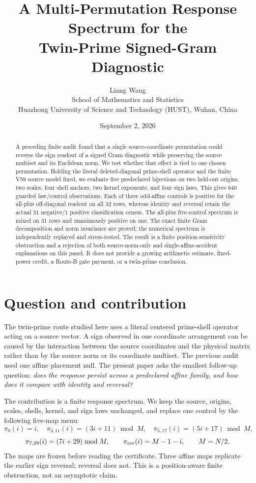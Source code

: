\documentclass[10pt]{article}
\title{A Multi-Permutation Response Spectrum for the\\
  \large Twin-Prime Signed-Gram Diagnostic}
\author{Liang Wang\\
School of Mathematics and Statistics\\
Huazhong University of Science and Technology (HUST), Wuhan, China}
\date{September 2, 2026}
\begin{document}
\maketitle

\begin{abstract}
A preceding finite audit found that a single source-coordinate permutation
could reverse the sign readout of a signed Gram diagnostic while preserving the
source multiset and its Euclidean norm.  We test whether that effect is tied to
one chosen permutation.  Holding the literal deleted-diagonal prime-shell
operator and the finite V59 source model fixed, we evaluate five predeclared
bijections on two held-out origins, two scales, four shell anchors, two kernel
exponents, and four sign laws.  This gives 640 guarded law/control
observations.  Each of three odd-affine controls is positive for the all-plus
off-diagonal readout on all 32 rows, whereas identity and reversal retain the
actual $31$ negative/$1$ positive classification census.  The all-plus
five-control spectrum is mixed on 31 rows and unanimously positive on one.
The exact finite Gram decomposition and norm invariance are proved; the
numerical spectrum is independently replayed and stress-tested.  The result
is a finite position-sensitivity obstruction and a rejection of both
source-norm-only and single-affine-accident explanations on this panel.  It
does not provide a growing arithmetic estimate, fixed-power credit, a
Route-B gate payment, or a twin-prime conclusion.
\end{abstract}

\section{Question and contribution}

The twin-prime route studied here uses a literal centered
prime-shell operator acting on a source vector.  A sign observed in one
coordinate arrangement can be caused by the interaction between the source
coordinates and the physical matrix rather than by the source norm or its
coordinate multiset.  The previous audit used one affine placement null.  The
present paper asks the smallest follow-up question:
\emph{does the response persist across a predeclared affine family, and how
does it compare with identity and reversal?}

The contribution is a finite response spectrum.  We keep the source, origins,
scales, shells, kernel, and sign laws unchanged, and replace one control by
the following five-map menu:
\[
 \pi_0(i)=i,\quad
 \pi_{3,11}(i)=(3i+11)\bmod M,\quad
 \pi_{5,17}(i)=(5i+17)\bmod M,
\]
\[
 \pi_{7,29}(i)=(7i+29)\bmod M,\qquad
 \pi_{\rm rev}(i)=M-1-i,\qquad M=N/2.
\]
The maps are frozen before reading the certificate.  Three affine maps
replicate the earlier sign reversal; reversal does not.  This is a
position-aware finite obstruction, not an asymptotic claim.
\end{document}
